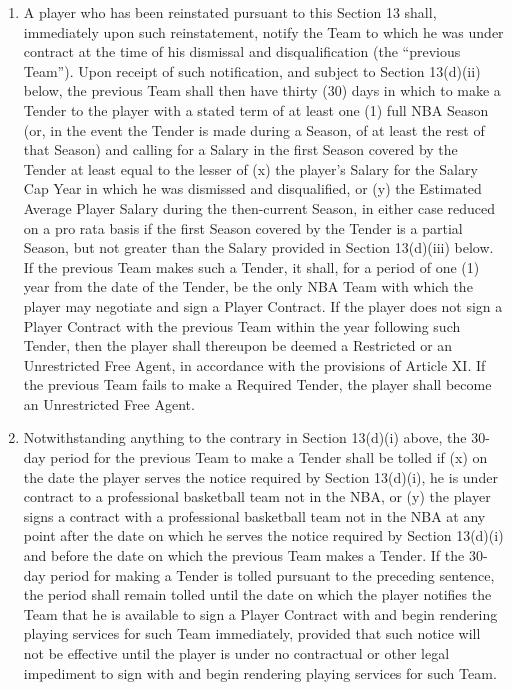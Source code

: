 \documentclass[
]{book}
\providecommand{\tightlist}{%
  \setlength{\itemsep}{0pt}\setlength{\parskip}{0pt}}
\begin{document}
\begin{enumerate}
\begin{enumerate}
  \def\labelenumii{(\roman{enumii})}
  \tightlist
  \item
    A player who has been reinstated pursuant to this Section 13 shall, immediately upon such reinstatement, notify the Team to which he was under contract at the time of his dismissal and disqualification (the ``previous Team''). Upon receipt of such notification, and subject to Section 13(d)(ii) below, the previous Team shall then have thirty (30) days in which to make a Tender to the player with a stated term of at least one (1) full NBA Season (or, in the event the Tender is made during a Season, of at least the rest of that Season) and calling for a Salary in the first Season covered by the Tender at least equal to the lesser of (x) the player's Salary for the Salary Cap Year in which he was dismissed and disqualified, or (y) the Estimated Average Player Salary during the then-current Season, in either case reduced on a pro rata basis if the first Season covered by the Tender is a partial Season, but not greater than the Salary provided in Section 13(d)(iii) below. If the previous Team makes such a Tender, it shall, for a period of one (1) year from the date of the Tender, be the only NBA Team with which the player may negotiate and sign a Player Contract. If the player does not sign a Player Contract with the previous Team within the year following such Tender, then the player shall thereupon be deemed a Restricted or an Unrestricted Free Agent, in accordance with the provisions of Article XI. If the previous Team fails to make a Required Tender, the player shall become an Unrestricted Free Agent.
  \item
    Notwithstanding anything to the contrary in Section 13(d)(i) above, the 30-day period for the previous Team to make a Tender shall be tolled if (x) on the date the player serves the notice required by Section 13(d)(i), he is under contract to a professional basketball team not in the NBA, or (y) the player signs a contract with a professional basketball team not in the NBA at any point after the date on which he serves the notice required by Section 13(d)(i) and before the date on which the previous Team makes a Tender. If the 30-day period for making a Tender is tolled pursuant to the preceding sentence, the period shall remain tolled until the date on which the player notifies the Team that he is available to sign a Player Contract with and begin rendering playing services for such Team immediately, provided that such notice will not be effective until the player is under no contractual or other legal impediment to sign with and begin rendering playing services for such Team.

\end{enumerate}
\end{enumerate}
\end{document}
